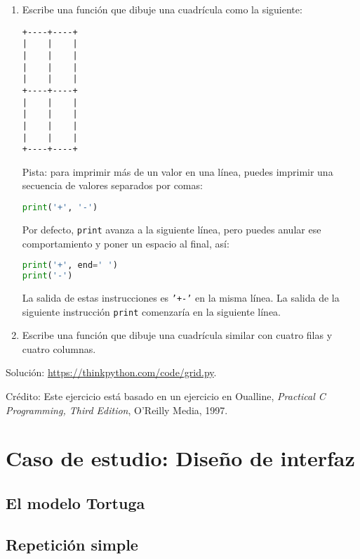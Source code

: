 \documentclass[12pt,letterpaper]{book}
\begin{document}
\begin{enumerate}
\item Escribe una función que dibuje una cuadrícula como la siguiente:

\begin{lstlisting}
+----+----+
|    |    |
|    |    |
|    |    |
|    |    |
+----+----+
|    |    |
|    |    |
|    |    |
|    |    |
+----+----+
\end{lstlisting}

Pista: para imprimir más de un valor en una línea, puedes imprimir una secuencia de valores separados por comas:

\begin{lstlisting}[language=Python]
print('+', '-')
\end{lstlisting}

Por defecto, \texttt{print} avanza a la siguiente línea, pero puedes anular ese comportamiento y poner un espacio al final, así:

\begin{lstlisting}[language=Python]
print('+', end=' ')
print('-')
\end{lstlisting}

La salida de estas instrucciones es \texttt{'+-'} en la misma línea. La salida de la siguiente instrucción \texttt{print} comenzaría en la siguiente línea.

\item Escribe una función que dibuje una cuadrícula similar con cuatro filas y cuatro columnas.
\end{enumerate}

Solución: \href{https://thinkpython.com/code/grid.py}{https://thinkpython.com/code/grid.py}.

Crédito: Este ejercicio está basado en un ejercicio en Oualline, \textit{Practical C Programming, Third Edition}, O'Reilly Media, 1997.






\chapter{Caso de estudio: Diseño de interfaz}


\section{El modelo Tortuga}
\section{Repetición simple}
\end{document}
